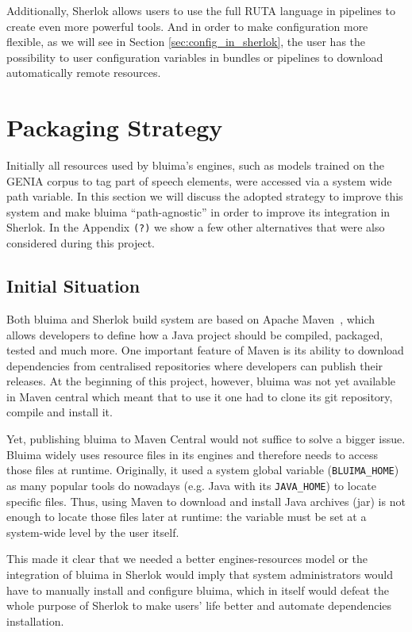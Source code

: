 \documentclass{article}
\newcommand{\VAR}[1]{\mbox{\texttt{#1}}}
\newcommand{\TODO}[1]{\texttt{\textcolor{YellowOrange}{(#1)}}} %
\begin{document}
Additionally, Sherlok allows users to use the full RUTA language in pipelines to create even more
powerful tools. And in order to make configuration more flexible, as we will see in Section
\ref{sec:config_in_sherlok}, the user has the possibility to user configuration variables in bundles
or pipelines to download automatically remote resources.

\section{Packaging Strategy}

Initially all resources used by bluima's engines, such as models trained on the GENIA corpus
\cite{genia} to tag part of speech elements, were accessed via a system wide path variable. In this
section we will discuss the adopted strategy to improve this system and make bluima
``path-agnostic'' in order to improve its integration in Sherlok. In the Appendix \TODO{?} we show a
few other alternatives that were also considered during this project.

\subsection{Initial Situation}

Both bluima and Sherlok build system are based on Apache Maven~\cite{maven}, which allows developers
to define how a Java project should be compiled, packaged, tested and much more. One important
feature of Maven is its ability to download dependencies from centralised repositories where
developers can publish their releases. At the beginning of this project, however, bluima was not yet
available in Maven central which meant that to use it one had to clone its git repository, compile
and install it.

Yet, publishing bluima to Maven Central would not suffice to solve a bigger issue. Bluima widely
uses resource files in its engines and therefore needs to access those files at runtime. Originally,
it used a system global variable (\VAR{BLUIMA\_HOME}) as many popular tools do nowadays (e.g. Java
with its \VAR{JAVA\_HOME}) to locate specific files. Thus, using Maven to download and install Java
archives (jar) is not enough to locate those files later at runtime: the variable must be set at a
system-wide level by the user itself.

This made it clear that we needed a better engines-resources model or the integration of bluima in
Sherlok would imply that system administrators would have to manually install and configure bluima,
which in itself would defeat the whole purpose of Sherlok to make users' life better and automate
dependencies installation.
\end{document}
